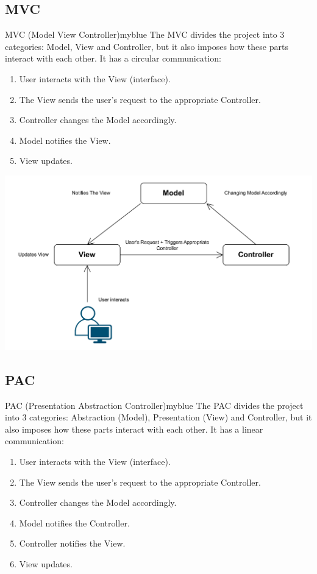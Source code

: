 \subsection{MVC}
\begin{prettyBox}{MVC (Model View Controller)}{myblue}
The MVC divides the project into 3 categories: Model, View and Controller, but it also imposes how 
these parts interact with each other. It has a circular communication:
\begin{enumerate}
    \item User interacts with the View (interface).
    \item The View sends the user’s request to the appropriate Controller.
    \item Controller changes the Model accordingly.
    \item Model notifies the View.
    \item View updates.
\end{enumerate}
\end{prettyBox}

\vspace{0.1cm}
\begin{center}
\includegraphics[height=0.25\textheight]{Chapters/MVC_PAC/mvc1.drawio.pdf}
\end{center}

\subsection{PAC}
\begin{prettyBox}{PAC (Presentation Abstraction Controller)}{myblue}
The PAC divides the project into 3 categories: Abstraction (Model), Presentation (View) and Controller, but it also imposes how 
these parts interact with each other. It has a linear communication:
\begin{enumerate}
    \item User interacts with the View (interface).
    \item The View sends the user’s request to the appropriate Controller.
    \item Controller changes the Model accordingly.
    \item Model notifies the Controller.
    \item Controller notifies the View.
    \item View updates.
\end{enumerate}   
\end{prettyBox}

